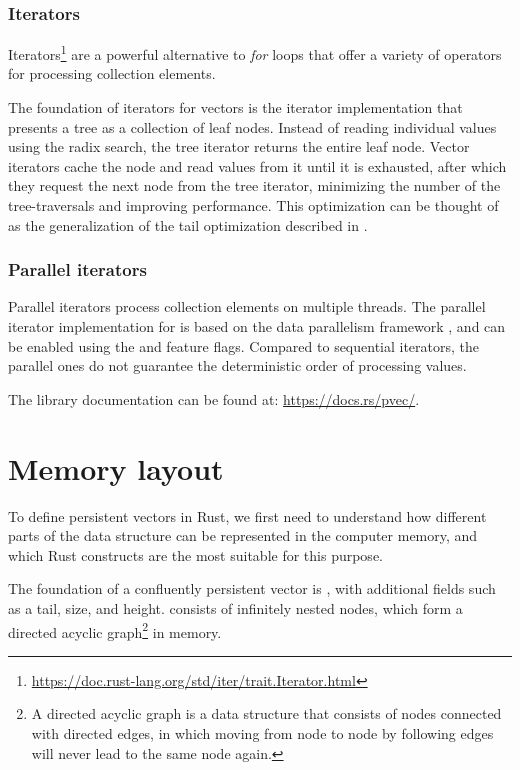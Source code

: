 \subsubsection*{Iterators}
Iterators\footnote{\url{https://doc.rust-lang.org/std/iter/trait.Iterator.html}} are a powerful alternative to \emph{for} loops that offer a variety of operators for processing collection elements.

The foundation of iterators for \pvecrs{} vectors is the \rrbtree{} iterator implementation that presents a tree as a collection of leaf nodes. Instead of reading individual values using the radix search, the tree iterator returns the entire leaf node. Vector iterators cache the node and read values from it until it is exhausted, after which they request the next node from the tree iterator, minimizing the number of the tree-traversals and improving performance. This optimization can be thought of as the generalization of the tail optimization described in .

\subsubsection*{Parallel iterators}
Parallel iterators process collection elements on multiple threads. The parallel iterator implementation for \pvecrs{} is based on the data parallelism framework \rayon{}, and can be enabled using the  and  feature flags. Compared to sequential iterators, the parallel ones do not guarantee the deterministic order of processing values.

The library documentation can be found at: \url{https://docs.rs/pvec/}.

\section{Memory layout}
To define persistent vectors in Rust, we first need to understand how different parts of the data structure can be represented in the computer memory, and which Rust constructs are the most suitable for this purpose.

The foundation of a confluently persistent vector is \rrbtree{}, with additional fields such as a tail, size, and height. \rrbtree{} consists of infinitely nested nodes, which form a directed acyclic graph\footnote{A directed acyclic graph is a data structure that consists of nodes connected with directed edges, in which moving from node to node by following edges will never lead to the same node again.} in memory.

